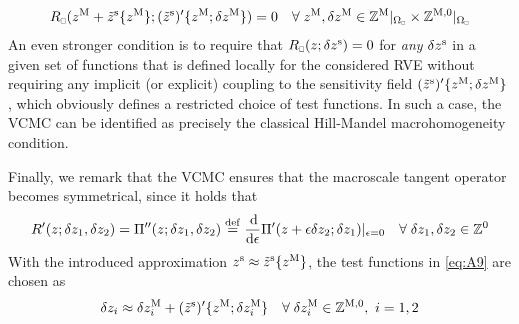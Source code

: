 \documentclass[MikaelDissertation.tex]{subfiles}
\begin{document}
\begin{align}
\label{eq:A8} R_\rve(z^\macro + \tilde z^\fluct\{z^\macro\};(\tilde{z}^\fluct)'\{z^\macro;\delta z^\macro\}) = 0\quad \forall\;z^\macro,\delta z^\macro\in\set Z^{\macro}|_{\Omega_\rve}\times\set Z^{\macro,0}|_{\Omega_\rve}
\end{align}
An even stronger condition is to require that $R_\rve(z;\delta z^\fluct) = 0$ for \emph{any} $\delta z^{\mathrm{s}}$ in a given set of functions that is defined locally for the considered RVE without requiring any implicit (or explicit) 
coupling to the sensitivity field $(\tilde{z}^{\mathrm{s}})'\{z^{\mathrm{M}};\delta z^{\mathrm{M}}\}$, which obviously defines a restricted choice of test functions.
In such a case, the VCMC can be identified as precisely the classical Hill-Mandel macrohomogeneity condition.

Finally, we remark that the VCMC ensures that the macroscale tangent operator becomes symmetrical, since it holds that
\begin{align}
\label{eq:A9} R'(z;\delta z_1,\delta z_2) = \Pi''(z;\delta z_1,\delta z_2) \overset{\mathrm{def}}{=} \frac{\operatorname{d \!}}{\operatorname{d \!}\epsilon}\Pi'(z+\epsilon\delta z_2;\delta z_1)|_{\epsilon=0}\quad \forall\;\delta z_1,\delta z_2 \in \mathbb{Z}^0
\end{align}
With the introduced approximation $z^{\mathrm{s}} \approx \tilde{z}^{\mathrm{s}}\{z^{\mathrm{M}}\}$, the test functions in \cref{eq:A9} are chosen as
\begin{align}
\label{eq:A10} \delta z_i \approx \delta z_i^{\mathrm{M}} + (\tilde{z}^{\mathrm{s}})'\{z^{\mathrm{M}};\delta z_i^{\mathrm{M}}\} \quad \forall\;\delta z_i^{\mathrm{M}}\in\mathbb{Z}^{\mathrm{M},0}, \,\, i=1,2
\end{align}






\end{document}
